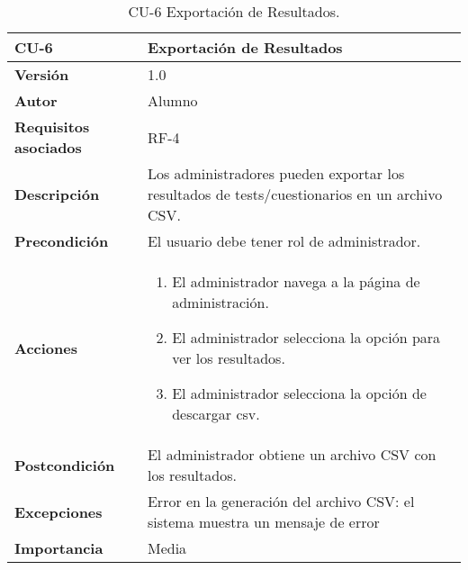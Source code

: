 \begin{table}[p]
	\centering
	\begin{tabularx}{\linewidth}{ p{} p{} }
		\toprule
		\textbf{CU-6}    & \textbf{Exportación de Resultados}\\
		\toprule
		\textbf{Versión}              & 1.0    \\
		\textbf{Autor}                & Alumno \\
		\textbf{Requisitos asociados} & RF-4 \\
		\textbf{Descripción}          & Los administradores pueden exportar los resultados de tests/cuestionarios en un archivo CSV. \\
		\textbf{Precondición}         & El usuario debe tener rol de administrador. \\
		\textbf{Acciones}             &
		\begin{enumerate}
			\def\labelenumi{\arabic{enumi}.}
			\tightlist
			\item El administrador navega a la página de administración.
			\item El administrador selecciona la opción para ver los resultados.
                \item El administrador selecciona la opción de descargar csv.
		\end{enumerate}\\
		\textbf{Postcondición}        & El administrador obtiene un archivo CSV con los resultados. \\
		\textbf{Excepciones}          & Error en la generación del archivo CSV: el sistema muestra un mensaje de error \\
		\textbf{Importancia}          & Media \\
		\bottomrule
	\end{tabularx}
	\caption{CU-6 Exportación de Resultados.}
\end{table}